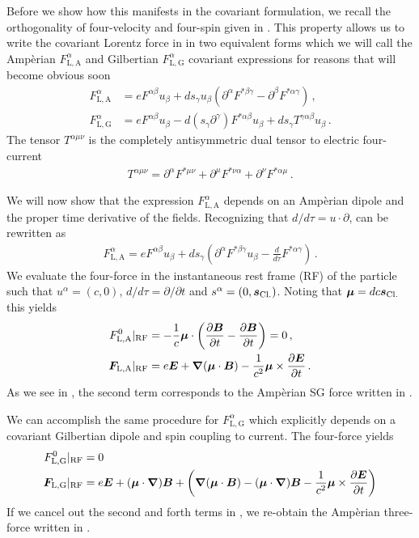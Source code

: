 Before we show how this manifests in the covariant formulation, we recall the orthogonality of four-velocity and four-spin given in . This property allows us to write the covariant Lorentz force in  in two equivalent forms which we will call the Amp{\`e}rian $F_\mathrm{L,A}^{\alpha}$ and Gilbertian $F_\mathrm{L,G}^{\alpha}$ covariant expressions for reasons that will become obvious soon
\begin{align}
\label{amp}
F_\mathrm{L,A}^{\alpha} &= eF^{\alpha\beta}u_{\beta} + ds_{\gamma}u_{\beta}(\partial^{\alpha}F^{*\beta\gamma}-\partial^{\beta}F^{*\alpha\gamma})\,,\\
\label{gil}
F_\mathrm{L,G}^{\alpha} &= eF^{\alpha\beta}u_{\beta} -d(s_{\gamma}\partial^{\gamma})F^{*\alpha\beta}u_{\beta}+ds_{\gamma}T^{\gamma\alpha\beta}u_{\beta}\,.
\end{align}
The tensor $T^{\alpha\mu\nu}$ is the completely antisymmetric dual tensor to electric four-current
\begin{align}
    T^{\alpha\mu\nu} = \partial^{\alpha}F^{*\mu\nu}+\partial^{\mu}F^{*\nu\alpha}+\partial^{\nu}F^{*\alpha\mu}\,.
\end{align}

We will now show that the expression $F_\mathrm{L,A}^{\alpha}$ depends on an Amp{\`e}rian dipole and the proper time derivative of the fields. Recognizing that $d/d\tau=u\cdot\partial$,  can be rewritten as
\begin{align}
F_\mathrm{L,A}^{\alpha} = eF^{\alpha\beta}u_{\beta} + ds_{\gamma}\left(\partial^{\alpha}F^{*\beta\gamma}u_{\beta}-\frac{d}{d\tau}F^{*\alpha\gamma}\right)\,.
\end{align}
We evaluate the four-force in the instantaneous rest frame (RF) of the particle such that $u^{\alpha}=(c,0)$, $d/d\tau=\partial/\partial t$ and $s^{\alpha}=(0,\boldsymbol{s}_\mathrm{Cl.})$. Noting that $\boldsymbol{\mu}=dc\boldsymbol{s}_\mathrm{Cl.}$ this yields
\begin{alignat}{1}
\label{amp:1}
F_\mathrm{L,A}^{0}\vert_\mathrm{RF} &= -\frac{1}{c}\boldsymbol{\mu}\cdot\left(\frac{\partial\boldsymbol{B}}{\partial t}-\frac{\partial\boldsymbol{B}}{\partial t}\right)=0\,,\\
\label{amp:2}
\boldsymbol{F}_\mathrm{L,A}\vert_\mathrm{RF} &= e\boldsymbol{E} + \boldsymbol{\nabla}(\boldsymbol{\mu}\cdot\boldsymbol{B})-\frac{1}{c^{2}}\boldsymbol{\mu}\times\frac{\partial\boldsymbol{E}}{\partial t}\,.
\end{alignat}
As we see in , the second term corresponds to the Amp{\`e}rian SG force written in .

We can accomplish the same procedure for $F_\mathrm{L,G}^{\alpha}$ which explicitly depends on a covariant Gilbertian dipole and spin coupling to current. The four-force yields
\begin{alignat}{1}
\label{gil:1}
F_\mathrm{L,G}^{0}\vert_\mathrm{RF} &=0\\
\label{gil:2}
\boldsymbol{F}_\mathrm{L,G}\vert_\mathrm{RF} &= e\boldsymbol{E} +(\boldsymbol{\mu}\cdot\boldsymbol{\nabla})\boldsymbol{B}+\left(\boldsymbol{\nabla}(\boldsymbol{\mu}\cdot\boldsymbol{B})-(\boldsymbol{\mu}\cdot\boldsymbol{\nabla})\boldsymbol{B}-\frac{1}{c^{2}}\boldsymbol{\mu}\times\frac{\partial\boldsymbol{E}}{\partial t}\right)
\end{alignat}
If we cancel out the second and forth terms in , we re-obtain the Amp{\`e}rian three-force written in .

